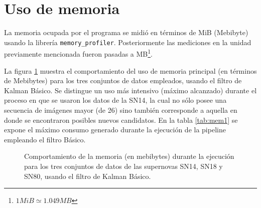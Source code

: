 \section{Uso de memoria}

La memoria ocupada por el programa se midi\'o en t\'erminos de MiB (Mebibyte) usando la librer\'ia \texttt{memory\_profiler}. Posteriormente las mediciones en la unidad previamente mencionada fueron pasadas a MB\footnote{$1MiB\simeq 1.049MB$ }.
\bigskip

La figura \ref{fig:mem_kbf} muestra el comportamiento del uso de memoria principal (en t\'erminos de Mebibytes) para los tres conjuntos de datos empleados, usando el filtro de Kalman B\'asico. Se distingue un uso m\'as intensivo (m\'aximo alcanzado) durante el proceso en que se usaron los datos de la SN14, la cual no s\'olo posee una secuencia de im\'agenes mayor (de 26) sino tambi\'en corresponde a aquella en donde se encontraron posibles nuevos candidatos. En la tabla \ref{tab:mem1} se expone el m\'aximo consumo generado durante la ejecuci\'on de la pipeline empleando el filtro B\'asico.
\bigskip

\begin{figure}[h!]
\centering
{}\hfill
{}\vfill
{}
\caption{Comportamiento de la memoria (en mebibytes) durante la ejecuci\'on para los tres conjuntos de datos  de las supernovas SN14, SN18 y SN80, usando el filtro de Kalman B\'asico.}
\label{fig:mem_kbf}
\end{figure}

